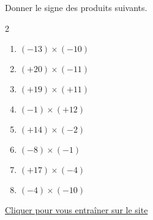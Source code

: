 \begin{exercice*}
    Donner le signe des produits suivants.
    \begin{multicols}2
        \begin{enumerate}
            \item $ (-13) \times (-10) $
            \item $ (+20) \times (-11) $
            \item $ (+19) \times (+11) $
            \item $ (-1) \times (+12) $
            \item $ (+14) \times (-2) $
            \item $ (-8) \times (-1) $
            \item $ (+17) \times (-4) $
            \item $ (-4) \times (-10) $
        \end{enumerate}
    \end{multicols}

    \href{https://coopmaths.fr/mathalea.html?ex=4C10-1,s=1,n=8,i=1&v=l}{Cliquer pour vous entraîner sur le site \mathaleaLogo} 
\end{exercice*}
